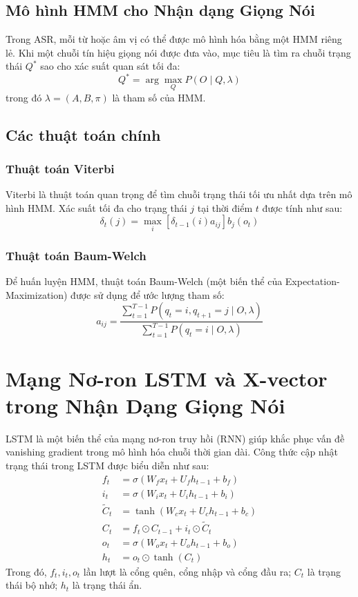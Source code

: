 \documentclass{article}
\begin{document}
\subsection{Mô hình HMM cho Nhận dạng Giọng Nói}
Trong ASR, mỗi từ hoặc âm vị có thể được mô hình hóa bằng một HMM riêng lẻ. Khi một chuỗi tín hiệu giọng nói được đưa vào, mục tiêu là tìm ra chuỗi trạng thái $Q^*$ sao cho xác suất quan sát tối đa:
\begin{equation}
    Q^* = \arg\max_Q P(O \mid Q, \lambda)
\end{equation}
trong đó $\lambda = (A, B, \pi)$ là tham số của HMM.

\subsection{Các thuật toán chính}
\subsubsection{Thuật toán Viterbi}
Viterbi là thuật toán quan trọng để tìm chuỗi trạng thái tối ưu nhất dựa trên mô hình HMM. Xác suất tối đa cho trạng thái $j$ tại thời điểm $t$ được tính như sau:
\begin{equation}
    \delta_t(j) = \max_i \left[ \delta_{t-1}(i) a_{ij} \right] b_j(o_t)
\end{equation}
\subsubsection{Thuật toán Baum-Welch}
Để huấn luyện HMM, thuật toán Baum-Welch (một biến thể của Expectation-Maximization) được sử dụng để ước lượng tham số:
\begin{equation}
    a_{ij} = \frac{\sum_{t=1}^{T-1} P(q_t = i, q_{t+1} = j \mid O, \lambda)}{\sum_{t=1}^{T-1} P(q_t = i \mid O, \lambda)}
\end{equation}

\section{Mạng Nơ-ron LSTM và X-vector trong Nhận Dạng Giọng Nói}
LSTM là một biến thể của mạng nơ-ron truy hồi (RNN) giúp khắc phục vấn đề vanishing gradient trong mô hình hóa chuỗi thời gian dài. Công thức cập nhật trạng thái trong LSTM được biểu diễn như sau:
\begin{align}
    f_t         & = \sigma(W_f x_t + U_f h_{t-1} + b_f)       \\
    i_t         & = \sigma(W_i x_t + U_i h_{t-1} + b_i)       \\
    \tilde{C}_t & = \tanh(W_c x_t + U_c h_{t-1} + b_c)        \\
    C_t         & = f_t \odot C_{t-1} + i_t \odot \tilde{C}_t \\
    o_t         & = \sigma(W_o x_t + U_o h_{t-1} + b_o)       \\
    h_t         & = o_t \odot \tanh(C_t)
\end{align}
Trong đó, $f_t, i_t, o_t$ lần lượt là cổng quên, cổng nhập và cổng đầu ra; $C_t$ là trạng thái bộ nhớ; $h_t$ là trạng thái ẩn.
\end{document}
